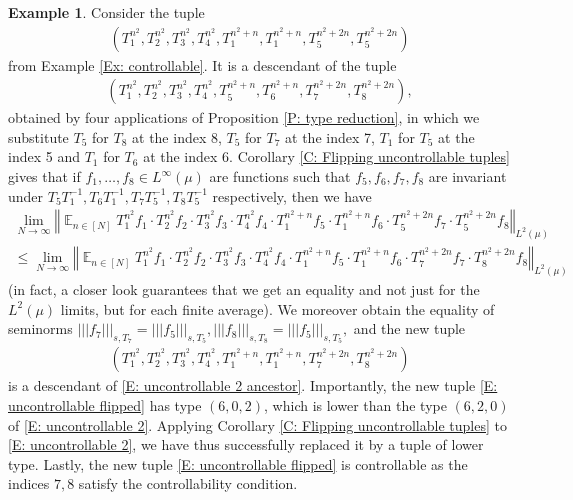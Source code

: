 \documentclass[11pt]{amsart}
\theoremstyle{definition}
\newtheorem{example}{Example}
\newcommand{\norm}[1]{\left\Vert #1\right\Vert}
\newcommand{\nnorm}[1]{\lvert\!|\!| #1|\!|\!\rvert}
\newcommand{\inv}{^{-1}}
\DeclareMathOperator*{\E}{\mathbb{E}}
\newcommand{\brac}[1]{\mathopen{}\left( #1 \mathclose{}\right)}
\begin{document}
\begin{example}\label{Ex: uncontrollable}
Consider the tuple
\begin{align}\label{E: uncontrollable 2}
    \brac{T_1^{n^2}, T_2^{n^2}, T_3^{n^2}, T_4^{n^2}, T_1^{n^2+n}, T_1^{n^2+n}, T_5^{n^2+2n}, T_5^{n^2+2n}}
\end{align}
from Example \ref{Ex: controllable}. It is a descendant of the tuple
\begin{align}\label{E: uncontrollable 2 ancestor}
    \brac{T_1^{n^2}, T_2^{n^2}, T_3^{n^2}, T_4^{n^2}, T_5^{n^2+n}, T_6^{n^2+n}, T_7^{n^2+2n}, T_8^{n^2+2n}},
\end{align}
obtained by four applications of Proposition \ref{P: type reduction}, in which we substitute $T_5$ for $T_8$ at the index 8, $T_5$ for $T_7$ at the index 7, $T_1$ for $T_5$ at the index 5 and $T_1$ for $T_6$ at the index 6. Corollary \ref{C: Flipping uncontrollable tuples} gives that if $f_1, \ldots, f_8\in L^\infty(\mu)$ are functions such that $f_5, f_6, f_7, f_8$ are invariant under $T_5 T_1\inv, T_6T_1\inv, T_7T_5\inv, T_8T_5\inv$ respectively, then we have
\begin{align*}
    \lim_{N\to\infty}\norm{\E_{n\in[N]}T_1^{n^2}f_1\cdot T_2^{n^2}f_2\cdot T_3^{n^2}f_3\cdot T_4^{n^2}f_4\cdot T_1^{n^2+n}f_5\cdot T_1^{n^2+n}f_6\cdot T_5^{n^2+2n}f_7\cdot T_5^{n^2+2n}f_8}_{L^2(\mu)}\\
    \leq \lim_{N\to\infty}\norm{\E_{n\in[N]}T_1^{n^2}f_1\cdot T_2^{n^2}f_2\cdot T_3^{n^2}f_3\cdot T_4^{n^2}f_4\cdot T_1^{n^2+n}f_5\cdot T_1^{n^2+n}f_6\cdot T_7^{n^2+2n}f_7\cdot T_8^{n^2+2n}f_8}_{L^2(\mu)}
\end{align*}
(in fact, a closer look guarantees that we get an equality and not just for the $L^2(\mu)$ limits, but for each finite average). We moreover obtain the equality of seminorms $\nnorm{f_7}_{s, T_7} = \nnorm{f_5}_{s, T_5},  \nnorm{f_8}_{s, T_8} = \nnorm{f_5}_{s, T_5},$
and the new tuple
\begin{align}\label{E: uncontrollable flipped}
    \brac{T_1^{n^2}, T_2^{n^2}, T_3^{n^2}, T_4^{n^2}, T_1^{n^2+n}, T_1^{n^2+n}, T_7^{n^2+2n}, T_8^{n^2+2n}}
\end{align}
is a descendant of  \eqref{E: uncontrollable 2 ancestor}. Importantly, the new tuple \eqref{E: uncontrollable flipped} has type $(6, 0, 2)$, which is lower than the type $(6, 2, 0)$ of \eqref{E: uncontrollable 2}. Applying Corollary \ref{C: Flipping uncontrollable tuples} to \eqref{E: uncontrollable 2}, we have thus successfully replaced it by a tuple of lower type. Lastly, the new tuple \eqref{E: uncontrollable flipped} is controllable as the indices $7, 8$ satisfy the controllability condition.
\end{example}
\end{document}
